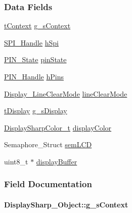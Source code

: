 \subsubsection*{Data Fields}
\begin{DoxyCompactItemize}
\item 
\hyperlink{structt_context}{t\+Context} \hyperlink{struct_display_sharp___object_af19836e99f0322d30e25072da923686a}{g\+\_\+s\+Context}
\item 
\hyperlink{_s_p_i_8h_a728806534c3c3e8675cfbfb7d8e36f13}{S\+P\+I\+\_\+\+Handle} \hyperlink{struct_display_sharp___object_ace64d49d3e54bd958f5631be3b5a019e}{h\+Spi}
\item 
\hyperlink{_p_i_n_8h_a36ef69d50df6baa6973482669c24a522}{P\+I\+N\+\_\+\+State} \hyperlink{struct_display_sharp___object_a133245fac86b982c1bb5add055d4f809}{pin\+State}
\item 
\hyperlink{_p_i_n_8h_afb2de52b054638f63c39df1f30a0d88d}{P\+I\+N\+\_\+\+Handle} \hyperlink{struct_display_sharp___object_a28bc001a0d3f47783cbf29c2bf54526c}{h\+Pins}
\item 
\hyperlink{_display_8h_a3d9ab99875c344491227a76f1d47e377}{Display\+\_\+\+Line\+Clear\+Mode} \hyperlink{struct_display_sharp___object_a1b911a160ce7d497a13c517038710d17}{line\+Clear\+Mode}
\item 
\hyperlink{structt_display}{t\+Display} \hyperlink{struct_display_sharp___object_aa5ad2483bcf6173eccb9ccbf4621e364}{g\+\_\+s\+Display}
\item 
\hyperlink{struct_display_sharp_color__t}{Display\+Sharp\+Color\+\_\+t} \hyperlink{struct_display_sharp___object_a99bea24fb7ee15769a37eb53087daf22}{display\+Color}
\item 
Semaphore\+\_\+\+Struct \hyperlink{struct_display_sharp___object_ae4ac08f3416782d171264aeee1e03fc4}{sem\+L\+C\+D}
\item 
uint8\+\_\+t $\ast$ \hyperlink{struct_display_sharp___object_a268dce94be3fcbae2e9d317810269932}{display\+Buffer}
\end{DoxyCompactItemize}


\subsubsection{Field Documentation}
\paragraph[{g\+\_\+s\+Context}]{ Display\+Sharp\+\_\+\+Object\+::g\+\_\+s\+Context}\label{struct_display_sharp___object_af19836e99f0322d30e25072da923686a}
